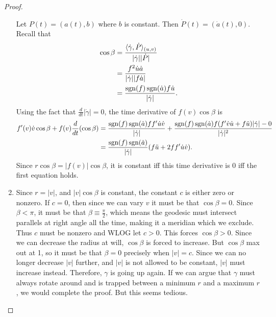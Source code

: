 \documentclass[12pt]{article}
\begin{document}
\begin{proof}
\begin{enumerate}[label=(\alph*)]
Let $ P(t) = (a(t), b)$ where $ b$ is constant. Then $ \dot{P}(t) = (\dot{a}(t),0)$. Recall that
\begin{align*}
	\cos \beta &= \frac{ \langle \dot{ \gamma}, \dot{P} \rangle_{(u,v)}}{ | \dot{ \gamma}||\dot{P}|} \\
	&= \frac{ f^2 \dot{u} \dot{a}}{ | \dot{ \gamma}| |f\dot{a}| } \\
	&= \frac{ \operatorname{sgn}(f) \operatorname{sgn}(\dot{a}) f \dot{u}}{ | \dot{ \gamma}|} .
\end{align*}
Using the fact that $ \frac{d}{dt}| \dot{ \gamma}| =0$, the time derivative of $ f(v) \cos \beta$ is
\begin{align*}
	f'(v) \dot{v} \cos \beta + f(v) \frac{d}{dt} (\cos \beta) &= \frac{ \operatorname{sgn}(f) \operatorname{sgn}(\dot{a}) ff' \dot{u}\dot{v}}{ | \dot{ \gamma}|} +  \frac{\operatorname{sgn}(f) \operatorname{sgn}(\dot{a})f(f'\dot{v}\dot{u}+f \ddot{u}) | \dot{ \gamma}| - 0}{ |\dot{ \gamma}|^2} \\
								  &= \frac{\operatorname{sgn}(f) \operatorname{sgn}(\dot{a})}{| \dot{ \gamma}|} (f \ddot{u} + 2 ff'\dot{u}\dot{v}) .
\end{align*}
Since $ r \cos \beta = |f(v)| \cos \beta$, it is constant iff this time derivative is 0 iff the first equation holds.
\item Since $ r = |v|$, and  $ |v| \cos \beta $ is constant, the constant $ c$ is either zero or nonzero. If $ c=0$, then since we can vary $ v$ it must be that  $ \cos \beta = 0$. Since $ \beta < \pi$, it must be that $ \beta \equiv \frac{\pi}{2}$, which means the geodesic must intersect parallels at right angle all the time, making it a meridian which we exclude. Thus $ c$ must be nonzero and WLOG let $ c>0$. This forces $ \cos \beta >0$. Since we can decrease the radius at will, $ \cos \beta$ is forced to increase. But $ \cos \beta$ max out at 1, so it must be that $ \beta = 0$ precisely when $ |v| = c$. Since we can no longer decrease $ |v|$ further, and  $ |v|$ is not allowed to be constant,  $ |v|$ must increase instead. Therefore, $ \gamma$ is going up again. If we can argue that $ \gamma$ must always rotate around and is trapped between a minimum $ r$ and a maximum  $ r$, we would complete the proof. But this seems tedious.
\end{enumerate}
\end{proof}
\end{document}
